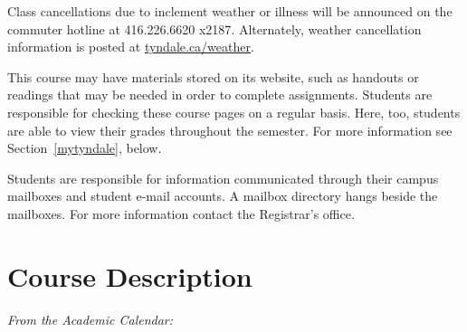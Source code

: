 \begin{titlepage}
\begin{center}
    \begin{description}\footnotesize
      \item[Commuter Hotline]
        Class cancellations due to inclement weather or
        illness will be announced on the commuter hotline at
        { 416.226.6620 x2187}.
        Alternately, weather cancellation information is posted at
        \href{http://tyndale.ca/weather}{tyndale.ca/weather}.
      \item[MyTyndale.ca]
        This course may have materials stored on its website, such as
        handouts or readings that may be needed in order to complete
        assignments. Students are responsible for checking these course
        pages on a regular basis. Here, too, students are able to view
        their grades throughout the semester. For more information see
        Section~\ref{mytyndale}, below.
      \item[Mail]
        Students are responsible for information communicated through
        their campus mailboxes and student e-mail accounts. A mailbox
        directory hangs beside the mailboxes. For more information
        contact the Registrar's office.
    \end{description}

  \end{center}

  \section{Course Description}
  \label{description}

  \emph{From the Academic Calendar:} \cdescrip

\end{titlepage}
\setcounter{page}{2} %
